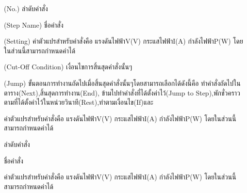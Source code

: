 \begin{itemize}
{\item (No.) ลำดับคำสั่ง}
{\item (Step Name) ชื่อคำสั่ง}
{\item (Setting) ค่าตัวแปรสำหรับคำสั่งคือ แรงดันไฟฟ้าV(V) กระแสไฟฟ้าI(A) กำลังไฟฟ้าP(W) โดยในส่วนนี้สามารถกำหนดค่าได้}
{\item (Cut-Off Condition) เงื่อนไขการสิ้นสุดคำสั่งนั้นๆ}
{\item (Jump) ขั้นตอนการทำงานถัดไปเมื่อสิ้นสุดคำสั่งนั้นๆโดยสามารถเลือกได้ดังนี้คือ ทำคำสั่งถัดไปในตาราง(Next),\newline สิ้นสุดการทำงาน(End), 
ข้ามไปทำคำสั่งที่ได้ตั้งค่าไว้(Jump to Step),พักชั่วคราวตามที่ได้ตั้งค่าไว้ในหน่วยวินาที(Rest),ทำตามเงื่อนไข(If)และ}
{\item ค่าตัวแปรสำหรับคำสั่งคือ แรงดันไฟฟ้าV(V) กระแสไฟฟ้าI(A) กำลังไฟฟ้าP(W) โดยในส่วนนี้สามารถกำหนดค่าได้}
{\item ลำดับคำสั่ง}
{\item ชื่อคำสั่ง}
{\item ค่าตัวแปรสำหรับคำสั่งคือ แรงดันไฟฟ้าV(V) กระแสไฟฟ้าI(A) กำลังไฟฟ้าP(W) โดยในส่วนนี้สามารถกำหนดค่าได้}
\end{itemize}





